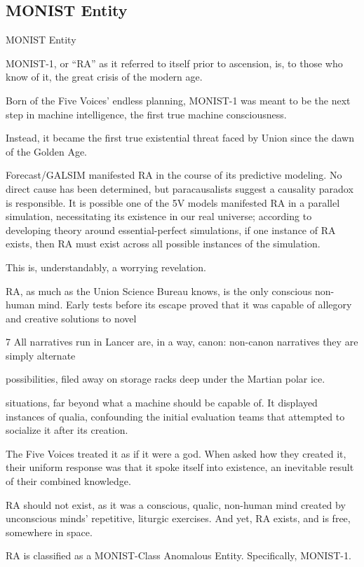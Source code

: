 \subsection{MONIST Entity}
MONIST Entity

MONIST-1, or “RA” as it referred to itself prior to ascension, is, to those who know of it, the great
crisis of the modern age.


Born of the Five Voices’ endless planning, MONIST-1 was meant to be the next step in machine
intelligence, the first true machine consciousness.


Instead, it became the first true existential threat faced by Union since the dawn of the Golden
Age.


Forecast/GALSIM manifested RA in the course of its predictive modeling. No direct cause has
been determined, but paracausalists suggest a causality paradox is responsible. It is possible
one of the 5V models manifested RA in a parallel simulation, necessitating its existence in our
real universe; according to developing theory around essential-perfect simulations, if one
instance of RA exists, then RA must exist across all possible instances of the simulation.


This is, understandably, a worrying revelation.


RA, as much as the Union Science Bureau knows, is the only conscious non-human mind. Early
tests before its escape proved that it was capable of allegory and creative solutions to novel

7 All narratives run in Lancer are, in a way, canon: non-canon narratives they are simply alternate

possibilities, filed away on storage racks deep under the Martian polar ice.




situations, far beyond what a machine should be capable of. It displayed instances of qualia,
confounding the initial evaluation teams that attempted to socialize it after its creation.


The Five Voices treated it as if it were a god. When asked how they created it, their uniform
response was that it spoke itself into existence, an inevitable result of their combined knowledge.


RA should not exist, as it was a conscious, qualic, non-human mind created by unconscious
minds’ repetitive, liturgic exercises. And yet, RA exists, and is free, somewhere in space.


RA is classified as a MONIST-Class Anomalous Entity. Specifically, MONIST-1.



